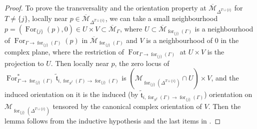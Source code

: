 \documentclass[11pt]{amsart}
\theoremstyle{definition}
\theoremstyle{remark}
\renewcommand{\for}{\operatorname{for}}
\newcommand{\For}{\operatorname{For}}
\newcommand{\<}{\left<}
\renewcommand{\>}{\right>}
\numberwithin{equation}{section}
\def\Mbar{{\overline{\mathcal M}}}
\begin{document}
\begin{proof}
To prove the transversality and the orientation property at $\Mbar_{\Delta^{{T\sqcup\{i\}}}}$ for $T\ne \{j\}$, locally near $p\in \Mbar_{\Delta^{{T\sqcup\{i\}}}}$, we can take a small neighbourhood $p=(\For_{\{j\}}(p),0)\in U\times V \subset \Mbar_{\Gamma}$, where $U\subset \Mbar_{\for_{\{j\}}(\Gamma)}$ is a neighbourhood of $\For_{\Gamma \to \for_{\{j\}}(\Gamma)}(p)$ in $ \Mbar_{\for_{\{j\}}(\Gamma)}$ and $V$ is a neighbourhood of 0 in the complex plane, where the restriction of $\For_{\Gamma \to \for_{\{j\}}(\Gamma)}$ at $U\times V$ is the projection to $U$. Then locally near $p$, the zero locus of $\For_{\Gamma\to \for_{\{j\}}(\Gamma)}^* \tilde{\mathfrak t}_{i,\for_{S^I}(\Gamma)\to \for_{\{j\}}(\Gamma)}$ is $(\mathcal M_{\for_{\{j\}}(\Delta^{T\sqcup\{i\}})}\cap U)\times V$, and the induced orientation on it is the induced (by $\tilde{\mathfrak t}_{i,\for_{S^I}(\Gamma)\to\for_{\{j\}}(\Gamma)}$) orientation on $\mathcal M_{\for_{\{j\}}(\Delta^{T\sqcup\{i\}})}$ tensored by the canonical complex orientation of $V$. Then the lemma follows from the inductive hypothesis and the last items in \cite[Proposition 3.1 and Proposition 3.3]{TZ1}.

\end{proof}
\end{document}

